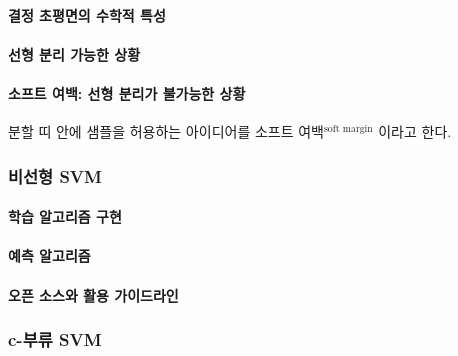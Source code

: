 \documentclass [12pt] {oblivoir}
\let\oldsubsubsection=\subsubsection
\renewcommand{\subsubsection}
{
  \filbreak
  \oldsubsubsection
}
\begin{document}
\paragraph*{결정 초평면의 수학적 특성}\mbox{}

\vspace{3mm}

\paragraph*{선형 분리 가능한 상황}\mbox{}

\vspace{3mm}

\paragraph*{소프트 여백: 선형 분리가 불가능한 상황}\mbox{}

분할 띠 안에 샘플을 허용하는 아이디어를 소프트 여백$^{\text{soft margin}}$ 이라고 한다.

\vspace{3mm}

\subsubsection{비선형 SVM}

\paragraph*{학습 알고리즘 구현}\mbox{}

\vspace{3mm}

\paragraph*{예측 알고리즘}\mbox{}

\vspace{3mm}

\paragraph*{오픈 소스와 활용 가이드라인}\mbox{}

\vspace{3mm}

\subsubsection{c-부류 SVM}
\end{document}
